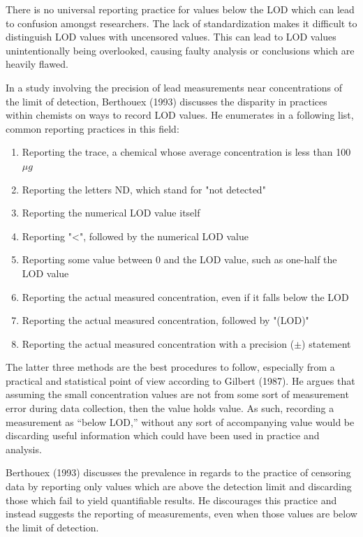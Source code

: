 \documentclass[12pt, twoside]{amherstthesis}
\begin{document}
There is no universal reporting practice for values below the LOD which can lead to confusion amongst researchers. The lack of standardization makes it difficult to distinguish LOD values with uncensored values. This can lead to LOD values unintentionally being overlooked, causing faulty analysis or conclusions which are heavily flawed.

In a study involving the precision of lead measurements near concentrations of the limit of detection, Berthouex (1993) discusses the disparity in practices within chemists on ways to record LOD values. He enumerates in a following list, common reporting practices in this field:
\begin{enumerate}
  \item Reporting the trace, a chemical whose average concentration is less than 100 $\mu g$
  \item Reporting  the letters ND, which stand for "not detected"
  \item Reporting the numerical LOD value itself
  \item Reporting "<", followed by the numerical LOD value
  \item Reporting some value between 0 and the LOD value, such as one-half the LOD value
  \item Reporting the actual measured concentration, even if it falls below the LOD
  \item Reporting the actual measured concentration, followed by "(LOD)"
  \item Reporting the actual measured concentration with a precision ($\pm$) statement
\end{enumerate}
The latter three methods are the best procedures to follow, especially from a practical and statistical point of view according to Gilbert (1987). He argues that assuming the small concentration values are not from some sort of measurement error during data collection, then the value holds value. As such, recording a measurement as ``below LOD,'' without any sort of accompanying value would be discarding useful information which could have been used in practice and analysis.

Berthouex (1993) discusses the prevalence in regards to the practice of censoring data by reporting only values which are above the detection limit and discarding those which fail to yield quantifiable results. He discourages this practice and instead suggests the reporting of measurements, even when those values are below the limit of detection.
\end{document}
